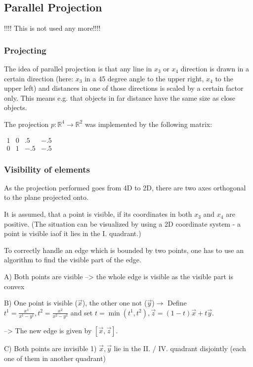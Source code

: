 \documentclass[titlepage]{scrartcl}
\begin{document}
\subsection{Parallel Projection}

!!!! This is not used any more!!!! 

\subsubsection{Projecting}
The idea of parallel projection is that any line in $x_3$ or $x_4$ direction is drawn in a certain direction (here: $x_3$ in a 45 degree angle to the upper right, $x_4$ to the upper left) and distances in one of those directions is scaled by a certain factor only. This means e.g. that objects in far distance have the same size as close objects. 

The projection $ p : \mathbb{R}^4 \to \mathbb{R}^2$ was implemented by the following matrix: 
\newline

$\begin{array}{cccc}
1 & 0 & .5 & -.5 \\ 
0 & 1 & -.5 & -.5
\end{array} $

\subsubsection{Visibility of elements}

As the projection performed goes from 4D to 2D, there are two axes orthogonal to the plane projected onto. 

It is assumed, that a point is visible, if its coordinates in both $x_3$ and $x_4$ are positive. (The situation can be visualized by using a 2D coordinate system - a point is visible iaof it lies in the I. quadrant.)

To correctly handle an edge which is bounded by two points, one has to use an algorithm to find the visible part of the edge. 

A) Both points are visible --> the whole edge is visible as the visible part is convex

B) One point is visible ($\vec{x}$), the other one not ($\vec{y}$)$\rightarrow$
Define $t^1 = \frac{x^1}{x^1 - y^1}, t^2 = \frac{x^2}{x^2 - y^2}$ and set $ t = \min(t^1, t^2), \vec{z} = (1 - t) \vec{x} + t \vec{y}$.

--> The new edge is given by $[\vec{x}, \vec{z}]$.

C) Both points are invisible
1) $\vec{x}, \vec{y}$ lie in the II. / IV. quadrant disjointly (each one of them in another quadrant)
\end{document}

